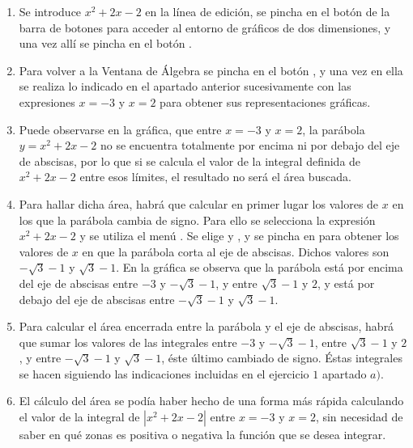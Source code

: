 \begin{enumerate}[leftmargin=*]
\begin{indicacion}
{\begin{enumerate}
\item Se introduce $x^{2}+2x-2$ en la línea de edición, se pincha en el botón
  de la barra de botones para acceder al entorno de gráficos de dos dimensiones, y
una vez allí se pincha en el botón .

\item Para volver a la Ventana de Álgebra se pincha en el botón
, y una vez en ella se realiza
lo indicado en el apartado anterior sucesivamente con las
expresiones $x=-3$ y $x=2$ para obtener sus representaciones
gráficas.

\item Puede observarse en la gráfica, que entre $x=-3$ y $x=2$,
la parábola $y=x^{2}+2x-2$ no se encuentra totalmente por encima ni
por debajo del eje de abscisas, por lo que si se calcula el valor de
la integral definida de $x^{2}+2x-2$ entre esos límites, el
resultado no será el área buscada.

\item Para hallar dicha área, habrá que calcular en primer lugar los valores
de $x$ en los que la parábola cambia de signo. Para ello se
selecciona la expresión $x^{2}+2x-2$ y se utiliza el menú
. Se elige  y
, y se pincha en  para obtener
los valores de $x$ en que la parábola corta al eje de abscisas.
Dichos valores son $-\sqrt{3}-1$ y $\sqrt{3}-1$. En la gráfica se
observa que la parábola está por encima del eje de abscisas entre
$-3$ y $-\sqrt{3}-1$, y entre $\sqrt{3}-1$ y $2$, y está por debajo
del eje de abscisas entre $-\sqrt{3}-1$ y $\sqrt{3}-1$.

\item Para calcular el área encerrada entre la parábola y el eje de
abscisas, habrá que sumar los valores de las integrales entre $-3$ y
$-\sqrt{3}-1$, entre $\sqrt{3}-1$ y $2$, y entre $-\sqrt{3}-1$ y
$\sqrt{3}-1$, éste último cambiado de signo. Éstas integrales se
hacen siguiendo las indicaciones incluidas en el ejercicio $1$
apartado $a)$.

\item El cálculo del área se podía haber hecho de una forma más rápida
calculando el valor de la integral de $|x^{2}+2x-2|$ entre $x=-3$ y
$x=2$, sin necesidad de saber en qué zonas es positiva o negativa la
función que se desea integrar.

\end{enumerate}
}
\end{indicacion}


\end{enumerate}

